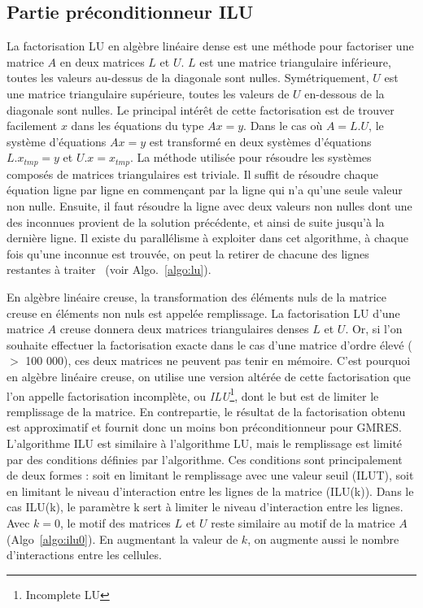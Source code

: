 \subsection{Partie préconditionneur ILU}
La factorisation LU en algèbre linéaire dense est une méthode pour factoriser une matrice $A$ en deux matrices $L$ et $U$.
%
$L$ est une matrice triangulaire inférieure, toutes les valeurs au-dessus de la diagonale sont nulles.
%
Symétriquement, $U$ est une matrice triangulaire supérieure, toutes les valeurs de $U$ en-dessous de la diagonale sont nulles.
%
Le principal intérêt de cette factorisation est de trouver facilement $x$ dans les équations du type $Ax=y$.
%
Dans le cas où $A=L.U$, le système d'équations $Ax=y$ est transformé en deux systèmes d'équations $L.x_{tmp}=y$ et $U.x=x_{tmp}$.
%
La méthode utilisée pour résoudre les systèmes composés de matrices triangulaires est triviale.
%
Il suffit de résoudre chaque équation ligne par ligne en commençant par la ligne qui n'a qu'une seule valeur non nulle.
%
Ensuite, il faut résoudre la ligne avec deux valeurs non nulles dont une des inconnues provient de la solution précédente, et ainsi de suite jusqu'à la dernière ligne.
%
Il existe du parallélisme à exploiter dans cet algorithme, à chaque fois qu'une inconnue est trouvée, on peut la retirer de chacune des lignes restantes à traiter~\cite{plasma_lu} (voir Algo.~\ref{algo:lu}).

En algèbre linéaire creuse, la transformation des éléments nuls de la matrice creuse en éléments non nuls est appelée remplissage.
%
La factorisation LU d'une matrice $A$ creuse donnera deux matrices triangulaires denses $L$ et $U$.
%
Or, si l'on souhaite effectuer la factorisation exacte dans le cas d'une matrice d'ordre élevé ($>$ 100 000), ces deux matrices ne peuvent pas tenir en mémoire.
%
C'est pourquoi en algèbre linéaire creuse, on utilise une version altérée de cette factorisation que l'on appelle factorisation incomplète, ou {\em ILU}\footnote{Incomplete LU}, dont le but est de limiter le remplissage de la matrice.
%
En contrepartie, le résultat de la factorisation obtenu est approximatif et fournit donc un moins bon préconditionneur pour GMRES.
%
L'algorithme ILU est similaire à l'algorithme LU, mais le remplissage est limité par des conditions définies par l'algorithme.
%
Ces conditions sont principalement de deux formes : soit en limitant le remplissage avec une valeur seuil (ILUT\cite{saad1994ilut}), soit en limitant le niveau d'interaction entre les lignes de la matrice (ILU(k)).
%
Dans le cas ILU(k), le paramètre k sert à limiter le niveau d'interaction entre les lignes.
%
Avec $k=0$, le motif des matrices $L$ et $U$ reste similaire au motif de la matrice $A$ (Algo~\ref{algo:ilu0}).
%
En augmentant la valeur de $k$, on augmente aussi le nombre d'interactions entre les cellules.


